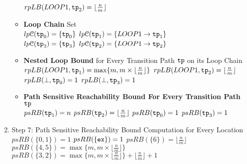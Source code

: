 \begin{enumerate}
\begin{itemize}
  $rpLB(LOOP1, \mathtt{tp}_2) = \lfloor\frac{n}{m}\rfloor$ 
  \item \textbf{Loop Chain} Set
  \\
  $lp\mathcal{C}(\mathtt{tp}_0) = \{\mathtt{tp}_0\}$ \qquad
  $lp\mathcal{C}(\mathtt{tp}_1) = \{LOOP1\to \mathtt{tp}_1\}$ \\
  $lp\mathcal{C}(\mathtt{tp}_3) = \{\mathtt{tp}_3\}$ \qquad
  $lp\mathcal{C}(\mathtt{tp}_2) = \{LOOP1\to \mathtt{tp}_2\}$ 
  \item \textbf{Nested Loop Bound }for Every Transition Path $\mathtt{tp}$ on its Loop Chain
  \\
  $rpLB(LOOP1, \mathtt{tp}_1) = \max\{m, m \times \lfloor\frac{n}{m}\rfloor\}$ \quad
  $rpLB(LOOP1, \mathtt{tp}_2) = \lfloor\frac{n}{m}\rfloor$  \\
  $rpLB(\bot, \mathtt{tp}_0) = 1$ \quad
  $rpLB(\bot, \mathtt{tp}_3) = 1$ 
  \item \textbf{Path Sensitive Reachability Bound For Every Transition Path $\mathtt{tp}$ }
  \\
  $psRB(\mathtt{tp}_1) = n$ \quad
  $psRB(\mathtt{tp}_2) = \lfloor\frac{n}{m}\rfloor$ \quad
  $psRB(\mathtt{tp}_0) = 1$ \quad
  $psRB(\mathtt{tp}_3) = 1$ 
\end{itemize}
\item Step 7: Path Sensitive Reachability Bound Computation for Every Location
\\
$psRB(\{0, 1\}) = 1$ \qquad
$psRB(\{\mathtt{ex}\}) = 1$ \qquad
$psRB(\{6 \}) = \lfloor\frac{n}{m}\rfloor$ \\
$psRB(\{4, 5 \}) = \max\{m, m \times \lfloor\frac{n}{m}\rfloor\}$ \quad
$psRB(\{3, 2 \}) = \max\{m, m \times \lfloor\frac{n}{m}\rfloor\} + \lfloor\frac{n}{m}\rfloor + 1 $ \\
\end{enumerate}